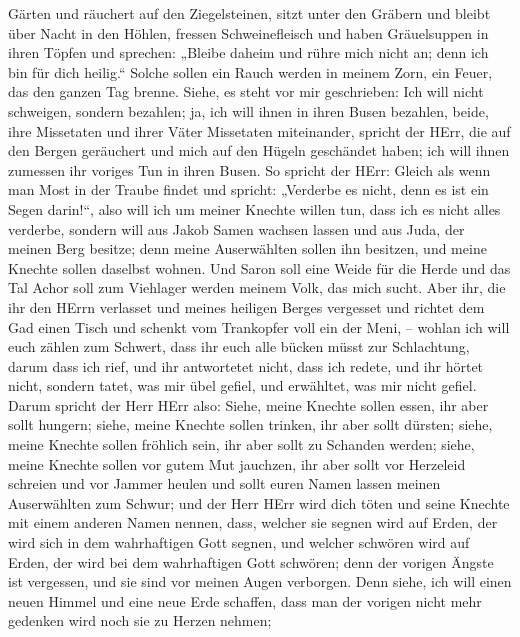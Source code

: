 Gärten und räuchert auf den Ziegelsteinen,  sitzt unter den
Gräbern und bleibt über Nacht in den Höhlen, fressen Schweinefleisch und
haben Gräuelsuppen in ihren Töpfen  und sprechen: „Bleibe
daheim und rühre mich nicht an; denn ich bin für dich heilig.`` Solche
sollen ein Rauch werden in meinem Zorn, ein Feuer, das den ganzen Tag
brenne.  Siehe, es steht vor mir geschrieben: Ich will nicht
schweigen, sondern bezahlen; ja, ich will ihnen in ihren Busen bezahlen,
 beide, ihre Missetaten und ihrer Väter Missetaten
miteinander, spricht der HErr, die auf den Bergen geräuchert und mich
auf den Hügeln geschändet haben; ich will ihnen zumessen ihr voriges Tun
in ihren Busen.  So spricht der HErr: Gleich als wenn man
Most in der Traube findet und spricht: „Verderbe es nicht, denn es ist
ein Segen darin!{}``, also will ich um meiner Knechte willen tun, dass
ich es nicht alles verderbe,  sondern will aus Jakob Samen
wachsen lassen und aus Juda, der meinen Berg besitze; denn meine
Auserwählten sollen ihn besitzen, und meine Knechte sollen daselbst
wohnen.  Und Saron soll eine Weide für die Herde und das
Tal Achor soll zum Viehlager werden meinem Volk, das mich sucht.
 Aber ihr, die ihr den HErrn verlasset und meines heiligen
Berges vergesset und richtet dem Gad einen Tisch und schenkt vom
Trankopfer voll ein der Meni, --  wohlan ich will euch
zählen zum Schwert, dass ihr euch alle bücken müsst zur Schlachtung,
darum dass ich rief, und ihr antwortetet nicht, dass ich redete, und ihr
hörtet nicht, sondern tatet, was mir übel gefiel, und erwähltet, was mir
nicht gefiel.  Darum spricht der Herr HErr also: Siehe,
meine Knechte sollen essen, ihr aber sollt hungern; siehe, meine Knechte
sollen trinken, ihr aber sollt dürsten; siehe, meine Knechte sollen
fröhlich sein, ihr aber sollt zu Schanden werden;  siehe,
meine Knechte sollen vor gutem Mut jauchzen, ihr aber sollt vor
Herzeleid schreien und vor Jammer heulen  und sollt euren
Namen lassen meinen Auserwählten zum Schwur; und der Herr HErr wird dich
töten und seine Knechte mit einem anderen Namen nennen, 
dass, welcher sie segnen wird auf Erden, der wird sich in dem
wahrhaftigen Gott segnen, und welcher schwören wird auf Erden, der wird
bei dem wahrhaftigen Gott schwören; denn der vorigen Ängste ist
vergessen, und sie sind vor meinen Augen verborgen.  Denn
siehe, ich will einen neuen Himmel und eine neue Erde schaffen, dass man
der vorigen nicht mehr gedenken wird noch sie zu Herzen nehmen;
